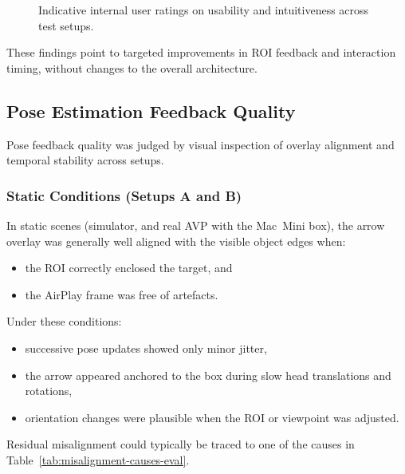 \begin{figure}[H]
    \centering
    \caption[User ratings on usability and intuitiveness]{Indicative internal user ratings on usability and intuitiveness across test setups.}
    \label{fig:uxratings}
\end{figure}

These findings point to targeted improvements in ROI feedback and interaction timing, without changes to the overall architecture.

\subsection{Pose Estimation Feedback Quality}

Pose feedback quality was judged by visual inspection of overlay alignment and temporal stability across setups.

\subsubsection{Static Conditions (Setups A and B)}

In static scenes (simulator, and real AVP with the Mac~Mini box), the arrow overlay was generally well aligned with the visible object edges when:

\begin{itemize}
    \item the ROI correctly enclosed the target, and
    \item the AirPlay frame was free of artefacts.
\end{itemize}

Under these conditions:

\begin{itemize}
    \item successive pose updates showed only minor jitter,
    \item the arrow appeared anchored to the box during slow head translations and rotations,
    \item orientation changes were plausible when the ROI or viewpoint was adjusted.
\end{itemize}

Residual misalignment could typically be traced to one of the causes in Table~\ref{tab:misalignment-causes-eval}.

